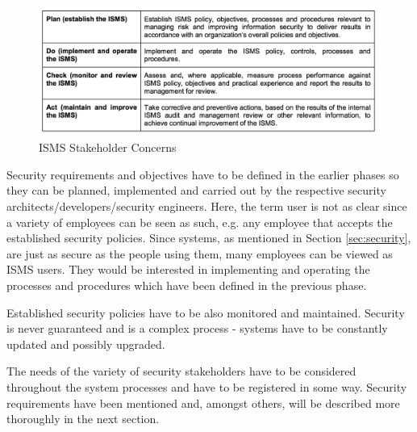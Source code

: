 \begin{figure}[H]
\centering
\includegraphics[width=\textwidth]{pictures/isms_concerns.png}
\caption{ISMS Stakeholder Concerns}
\label{fig:isms_stakeholder}
\end{figure}

Security requirements and objectives have to be defined in the earlier phases so they can be planned, implemented and carried out by the respective security architects/developers/security engineers. Here, the term user is not as clear since a variety of employees can be seen as such, e.g. any employee that accepts the established security policies. Since systems, as mentioned in Section \ref{sec:security}, are just as secure as the people using them, many employees can be viewed as ISMS users. They would be interested in implementing and operating the processes and procedures which have been defined in the previous phase.

Established security policies have to be also monitored and maintained. Security is never guaranteed and is a complex process \cite{vacca2012computer} - systems have to be constantly updated and possibly upgraded. 

The needs of the variety of security stakeholders have to be considered throughout the system processes and have to be registered in some way. Security requirements have been mentioned and, amongst others, will be described more thoroughly in the next section.

